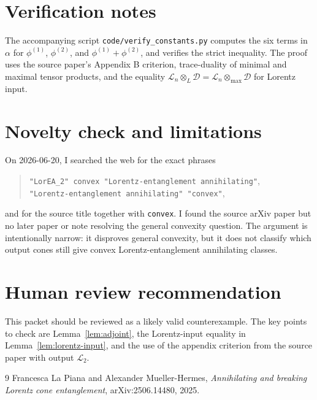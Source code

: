 \documentclass[11pt]{article}
\newcommand{\cD}{\mathcal D}
\newcommand{\cL}{\mathcal L}
\begin{document}
\section*{Verification notes}

The accompanying script \texttt{code/verify\_constants.py} computes the six
terms in \(\alpha\) for \(\phi^{(1)}\), \(\phi^{(2)}\), and
\(\phi^{(1)}+\phi^{(2)}\), and verifies the strict inequality.  The proof uses
the source paper's Appendix B criterion, trace-duality of minimal and maximal
tensor products, and the equality \(\cL_n\otimes_L\cD=\cL_n\otimes_{\max}\cD\)
for Lorentz input.

\section*{Novelty check and limitations}

On 2026-06-20, I searched the web for the exact phrases
\begin{quote}\small
\texttt{"LorEA\_2" convex "Lorentz-entanglement annihilating"},\\
\texttt{"Lorentz-entanglement annihilating" "convex"},
\end{quote}
and for the source title together with \texttt{convex}.  I found the source
arXiv paper but no later paper or note resolving the general convexity
question.  The argument is intentionally narrow: it disproves general
convexity, but it does not classify which output cones still give convex
Lorentz-entanglement annihilating classes.

\section*{Human review recommendation}

This packet should be reviewed as a likely valid counterexample.  The key
points to check are Lemma~\ref{lem:adjoint}, the Lorentz-input equality in
Lemma~\ref{lem:lorentz-input}, and the use of the appendix criterion from the
source paper with output \(\cL_2\).

\begin{thebibliography}{9}
Francesca La Piana and Alexander Mueller-Hermes,
\emph{Annihilating and breaking Lorentz cone entanglement},
arXiv:2506.14480, 2025.
\end{thebibliography}
\end{document}
